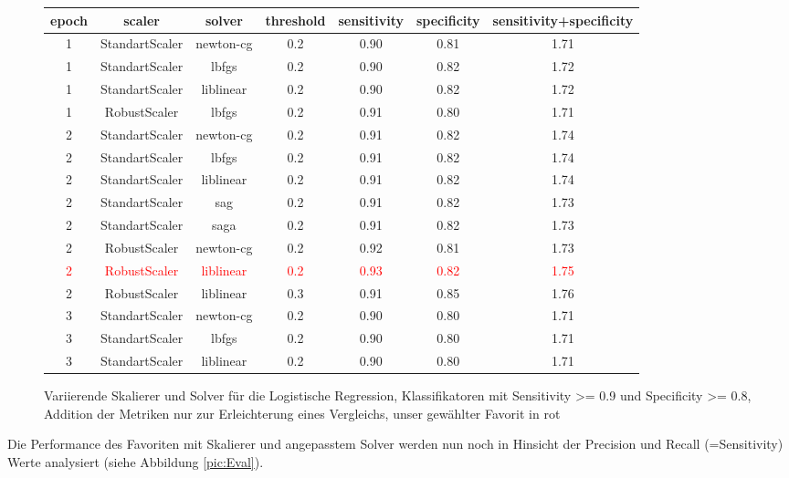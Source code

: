 \begin{figure}[H]
\begin{tabular}{c|c|c|c|c|c|c}
\textbf{epoch} & \textbf{scaler} & \textbf{solver} & \textbf{threshold} & \textbf{sensitivity} & \textbf{specificity} & \textbf{sensitivity+specificity} \\\hline\hline
1 & StandartScaler & newton-cg & 0.2 & 0.90 & 0.81 & 1.71 \\
1 & StandartScaler & lbfgs & 0.2 & 0.90 & 0.82 & 1.72 \\
1 & StandartScaler & liblinear & 0.2 & 0.90 & 0.82 & 1.72 \\
1 & RobustScaler & lbfgs & 0.2 & 0.91 & 0.80 & 1.71 \\
2 & StandartScaler & newton-cg & 0.2 & 0.91 & 0.82 & 1.74 \\
2 & StandartScaler & lbfgs & 0.2 & 0.91 & 0.82 & 1.74 \\
2 & StandartScaler & liblinear & 0.2 & 0.91 & 0.82 & 1.74 \\
2 & StandartScaler & sag & 0.2 & 0.91 & 0.82 & 1.73 \\
2 & StandartScaler & saga & 0.2 & 0.91 & 0.82 & 1.73 \\
2 & RobustScaler & newton-cg & 0.2 & 0.92 & 0.81 & 1.73 \\
\textcolor{red}{2} & \textcolor{red}{RobustScaler} & \textcolor{red}{liblinear} & \textcolor{red}{0.2} & \textcolor{red}{0.93} & \textcolor{red}{0.82} & \textcolor{red}{1.75} \\
2 & RobustScaler & liblinear & 0.3 & 0.91 & 0.85 & 1.76 \\
3 & StandartScaler & newton-cg & 0.2 & 0.90 & 0.80 & 1.71 \\
3 & StandartScaler & lbfgs & 0.2 & 0.90 & 0.80 & 1.71 \\
3 & StandartScaler & liblinear & 0.2 & 0.90 & 0.80 & 1.71
\end{tabular}
\caption{\label{tab:res2}
Variierende Skalierer und Solver für die Logistische Regression, Klassifikatoren mit Sensitivity >= 0.9 und Specificity >= 0.8, Addition der Metriken nur zur Erleichterung eines Vergleichs, unser gewählter Favorit in rot}
\end{figure}

Die Performance des Favoriten mit Skalierer und angepasstem Solver werden nun noch in Hinsicht der Precision und Recall (=Sensitivity) Werte analysiert (siehe Abbildung \ref{pic:Eval}).

